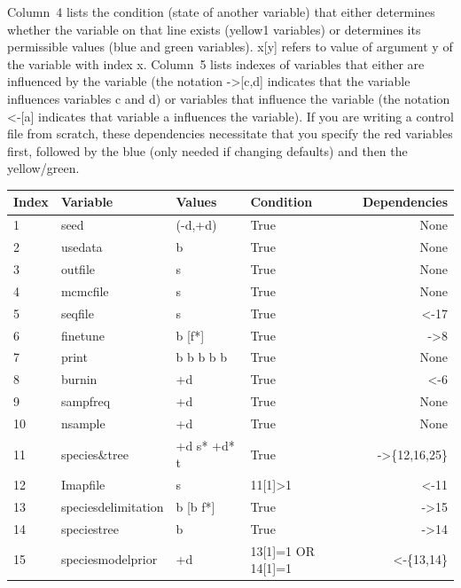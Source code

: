 \documentclass[a4paper]{book}
\numberwithin{equation}{section} \renewcommand{\baselinestretch}{0.55}
\begin{document}
Column~4 lists the condition (state of another variable) that either
determines whether the variable on that line exists (yellow1
variables) or determines its permissible values (blue and green
variables).  x[y] refers to value of argument y of the variable with
index x. Column~5 lists indexes of variables that either are
influenced by the variable (the notation ->[c,d] indicates that the
variable influences variables c and d) or variables that influence the
variable (the notation <-[a] indicates that variable a influences the
variable). If you are writing a control file from scratch, these
dependencies necessitate that you specify the red variables first,
followed by the blue (only needed if changing defaults) and then the
yellow/green.
\newpage
\begin{table}[h]
  \begin{center}
    {\small
    \begin{tabular}{@{}llllr@{}}
      \toprule
      Index & Variable & Values & Condition & Dependencies \\ \midrule
      1 & {\color{blue} seed} & (-d,+d) & True & None \\
      2 & {\color{blue} usedata} & b & True & None \\
      3 & {\color{red} outfile} & s & True& None \\
      4 & {\color{red} mcmcfile} & s & True & None \\
      5 & {\color{red} seqfile} & s & True & <-17 \\
      6 & {\color{red} finetune} & b [f*] & True & ->8 \\
      7 & {\color{red} print} & b b b b b & True & None \\
      8 & {\color{yellow1} burnin} & +d & True & <-6 \\
      9 & {\color{red} sampfreq} & +d & True & None \\
      10 & {\color{red} nsample} & +d & True & None \\
      11 & {\color{red} species\&tree} & +d s* +d* t & True & ->\{12,16,25\}  \\  
      12 & {\color{yellow1} Imapfile} & s & 11[1]>1 & <-11 \\
      13 & {\color{blue} speciesdelimitation} & b [b f*] & True & ->15 \\
      14 & {\color{blue} speciestree} & b & True & ->14 \\
      15 & {\color{yellow1} speciesmodelprior} & +d  & 13[1]=1 OR 14[1]=1 & <-\{13,14\} \\

\end{tabular}}
\end{center}
\end{table}
\end{document}
